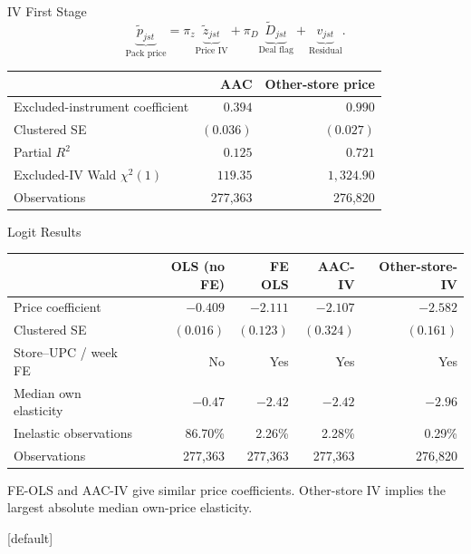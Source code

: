\documentclass[aspectratio=169,11pt]{beamer}
\begin{document}
\begin{frame}{IV First Stage}
\[\underbrace{\widetilde p_{jst}}_{\text{Pack price}} =
\pi_z\underbrace{\widetilde z_{jst}}_{\text{Price IV}} +
\pi_D\underbrace{\widetilde D_{jst}}_{\text{Deal flag}} +
\underbrace{v_{jst}}_{\text{Residual}}.\]
\small\centering\renewcommand\arraystretch{1.10}
\begin{tabular}{@{}lrr@{}}
\toprule
 & AAC & Other-store price \\
\midrule
Excluded-instrument coefficient & $0.394$ & $0.990$ \\
Clustered SE & $(0.036)$ & $(0.027)$ \\
\midrule
Partial $R^2$ & $0.125$ & $0.721$ \\
Excluded-IV Wald $\chi^2(1)$ & $119.35$ & $1{,}324.90$ \\
Observations & 277,363 & 276,820 \\
\bottomrule
\end{tabular}\par
\end{frame}
\begin{frame}{Logit Results}
\small\centering\renewcommand\arraystretch{1.2}
\begin{tabular}{@{}lrrrr@{}}
\toprule
 & OLS (no FE) & FE OLS & AAC-IV & Other-store-IV \\
\midrule
Price coefficient & $-0.409$ & $-2.111$ & $-2.107$ & $-2.582$ \\
Clustered SE & $(0.016)$ & $(0.123)$ & $(0.324)$ & $(0.161)$ \\
Store--UPC / week FE & No & Yes & Yes & Yes \\
Median own elasticity & $-0.47$ & $-2.42$ & $-2.42$ & $-2.96$ \\
Inelastic observations & 86.70\% & 2.26\% & 2.28\% & 0.29\% \\
Observations & 277,363 & 277,363 & 277,363 & 276,820 \\
\bottomrule
\end{tabular}\par

\par\medskip\raggedright
FE-OLS and AAC-IV give similar price coefficients. Other-store IV implies the largest absolute median own-price elasticity.
\end{frame}
[default]
\end{document}
